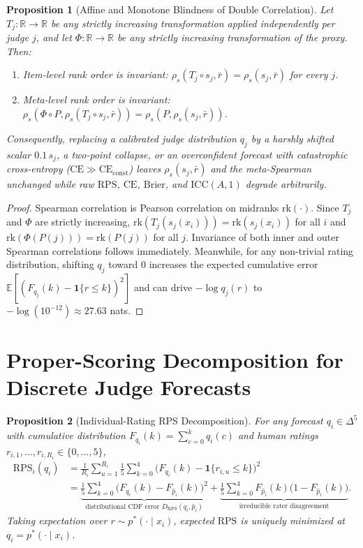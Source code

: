 \documentclass[11pt]{article}
\newtheorem{proposition}{Proposition}
\begin{document}
\begin{proposition}[Affine and Monotone Blindness of Double Correlation]
Let $T_j: \mathbb{R} \to \mathbb{R}$ be any strictly increasing transformation applied independently per judge $j$, and let $\Phi: \mathbb{R} \to \mathbb{R}$ be any strictly increasing transformation of the proxy. Then:
\begin{enumerate}
\item Item-level rank order is invariant: $\rho_s(T_j \circ s_j, \bar r) = \rho_s(s_j, \bar r)$ for every $j$.
\item Meta-level rank order is invariant: $\rho_s(\Phi \circ P, \rho_s(T_j \circ s_j, \bar r)) = \rho_s(P, \rho_s(s_j, \bar r))$.
\end{enumerate}
Consequently, replacing a calibrated judge distribution $q_j$ by a harshly shifted scalar $0.1\,s_j$, a two-point collapse, or an overconfident forecast with catastrophic cross-entropy ($\mathrm{CE} \gg \mathrm{CE}_{\mathrm{const}}$) leaves $\rho_s(s_j, \bar r)$ and the meta-Spearman unchanged while raw $\mathrm{RPS}$, $\mathrm{CE}$, $\mathrm{Brier}$, and $\mathrm{ICC}(A,1)$ degrade arbitrarily.
\end{proposition}

\begin{proof}
Spearman correlation is Pearson correlation on midranks $\mathrm{rk}(\cdot)$. Since $T_j$ and $\Phi$ are strictly increasing, $\mathrm{rk}(T_j(s_j(x_i))) = \mathrm{rk}(s_j(x_i))$ for all $i$ and $\mathrm{rk}(\Phi(P(j))) = \mathrm{rk}(P(j))$ for all $j$. Invariance of both inner and outer Spearman correlations follows immediately. Meanwhile, for any non-trivial rating distribution, shifting $q_j$ toward $0$ increases the expected cumulative error $\mathbb{E}[(F_{q_j}(k) - \mathbf{1}\{r \le k\})^2]$ and can drive $-\log q_j(r)$ to $-\log(10^{-12}) \approx 27.63$ nats.
\end{proof}

\section{Proper-Scoring Decomposition for Discrete Judge Forecasts}

\begin{proposition}[Individual-Rating RPS Decomposition]
For any forecast $q_i \in \Delta^5$ with cumulative distribution $F_{q_i}(k) = \sum_{c=0}^k q_i(c)$ and human ratings $r_{i,1},\dots,r_{i,R_i} \in \{0,\dots,5\}$,
\begin{align}
\mathrm{RPS}_i(q_i)
&= \frac{1}{R_i}\sum_{u=1}^{R_i}\frac{1}{5}\sum_{k=0}^{4}\bigl(F_{q_i}(k) - \mathbf{1}\{r_{i,u}\le k\}\bigr)^2 \nonumber \\
&= \underbrace{\frac{1}{5}\sum_{k=0}^{4}\bigl(F_{q_i}(k) - F_{\hat p_i}(k)\bigr)^2}_{\text{distributional CDF error } D_{\mathrm{RPS}}(q_i, \hat p_i)}
+ \underbrace{\frac{1}{5}\sum_{k=0}^{4} F_{\hat p_i}(k)\bigl(1 - F_{\hat p_i}(k)\bigr)}_{\text{irreducible rater disagreement}}.
\end{align}
Taking expectation over $r \sim p^*(\cdot \mid x_i)$, expected $\mathrm{RPS}$ is uniquely minimized at $q_i = p^*(\cdot \mid x_i)$.
\end{proposition}
\end{document}
